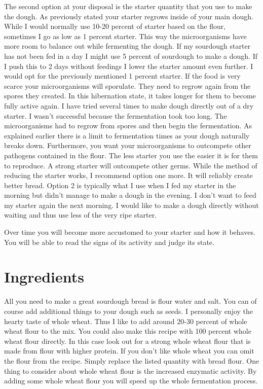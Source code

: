 The second option at your disposal is the starter quantity that
you use to make the dough. As previously stated your starter
regrows inside of your main dough. While I would normally use
10-20 percent of starter based on the flour, sometimes I go
as low as 1 percent starter. This way the microorganisms have
more room to balance out while fermenting the dough. If my sourdough
starter has not been fed in a day I might use 5 percent of sourdough
to make a dough.  If I push this to 2 days without feedings
I lower the starter amount even further. I would opt for the
previously mentioned 1 percent starter. If the food is very scarce
your microorganisms will sporulate. They need to regrow again
from the spores they created. In this hibernation state, it takes
longer for them to become fully active again. I have tried
several times to make dough directly out of a dry starter.
I wasn't successful because the fermentation took too long.
The microorganisms had to regrow from spores and then begin
the fermentation. As explained earlier there is a limit to
fermentation times as your dough naturally breaks down.
Furthermore, you want your microorganisms to outcompete
other pathogens contained in the flour. The less starter
you use the easier it is for them to reproduce. A strong
starter will outcompete other germs. While the method of
reducing the starter works, I recommend option one more.
It will reliably create better bread. Option 2 is typically
what I use when I fed my starter in the morning but didn't
manage to make a dough in the evening. I don't want to feed
my starter again the next morning. I would like to make a dough
directly without waiting and thus use less of the very ripe starter.

Over time you will become more accustomed to your starter
and how it behaves. You will be able to read the signs of its
activity and judge its state.

\section{Ingredients}

All you need to make a great sourdough bread is flour water and salt. You
can of course add additional things to your dough such as seeds. I personally
enjoy the hearty taste of whole wheat. Thus I like to add around 20-30 percent
of whole wheat flour to the mix. You could also make this recipe with 100 percent
whole wheat flour directly. In this case look out for a strong whole wheat
flour that is made from flour with higher protein. If you don't like whole
wheat you can omit the flour from the recipe. Simply replace the listed
quantity with bread flour. One thing to consider about whole wheat
flour is the increased enzymatic activity. By adding some whole wheat
flour you will speed up the whole fermentation process.

